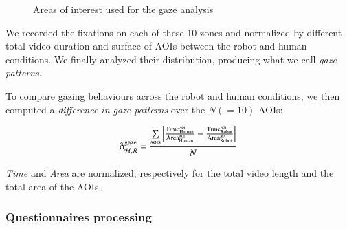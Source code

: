 \documentclass[lettersize, noapacite, twoside, HRI]{apa_HRI}
\begin{document}
\begin{figure}
    \centering

    \caption{Areas of interest used for the gaze analysis}
    \label{fig:aoi}
\end{figure}

We recorded the fixations on each of these 10 zones and normalized by different
total video duration and surface of AOIs between the robot and human conditions.
We finally analyzed their distribution, producing what we call \emph{gaze
patterns}.

To compare gazing behaviours across the robot and human conditions, we then
computed a \emph{difference in gaze patterns} over the $N(=10)$ AOIs:

{\large
\[
    \delta_{\mathcal{H}, \mathcal{R}}^{\text{gaze}} =
    \frac{\sum\limits_{{\text{{\sc aoi}s}}}\left |
    \frac{\text{Time}_{\text{Human}}^{\text{\sc
aoi}}}{\text{Area}_{\text{Human}}^{\text{\sc aoi}}} -
\frac{\text{Time}_{\text{Robot}}^{\text{\sc
aoi}}}{\text{Area}_{\text{Robot}}^{\text{\sc aoi}}} \right |}{N}
\]
}

\emph{Time} and \emph{Area} are normalized, respectively for the total
video length and the total area of the AOIs.

\subsubsection{Questionnaires processing}
\label{questionnaires_processing}
\end{document}
